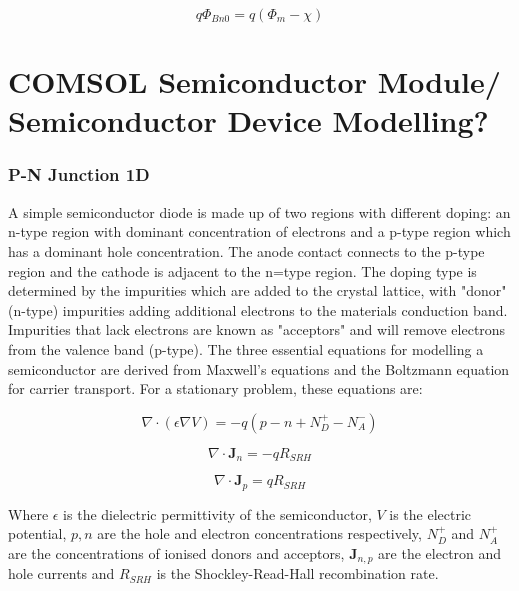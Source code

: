 \begin{equation}
    q\Phi_{Bn0} = q\left(\Phi_{m}-\chi\right)
    \label{eq:ideal_schottky_barrier}
\end{equation}

\part{COMSOL Semiconductor Module/ Semiconductor Device Modelling?}


\label{ch:semiconductor} %


\section{P-N Junction 1D}

A simple semiconductor diode is made up of two regions with different doping: an n-type region with dominant concentration of electrons and a p-type region which has a dominant hole concentration. The anode contact connects to the p-type region and the cathode is adjacent to the n=type region. The doping type is determined by the impurities which are added to the crystal lattice, with "donor" (n-type) impurities adding additional electrons to the materials conduction band. Impurities that lack electrons are known as "acceptors" and will remove electrons from the valence band (p-type). The three essential equations for modelling a semiconductor are derived from Maxwell's equations and the Boltzmann equation for carrier transport. For a stationary problem, these equations are:

\begin{equation}
\nabla\cdot\left(\epsilon\nabla V\right) = -q\left(p-n+N_{D}^{+}-N_{A}^{-}\right)
\end{equation}

\begin{equation}
\nabla\cdot\bm{J}_{n}=-qR_{SRH}
\end{equation}

\begin{equation}
\nabla\cdot\bm{J}_{p}=qR_{SRH}
\end{equation}

Where $\epsilon$ is the dielectric permittivity of the semiconductor, $V$ is the electric potential, $p,n$ are the hole and electron concentrations respectively, $N_{D}^{+}$ and $N_{A}^{+}$ are the concentrations of ionised donors and acceptors, $\bm{J}_{n,p}$ are the electron and hole currents and $R_{SRH}$ is the Shockley-Read-Hall recombination rate. 


